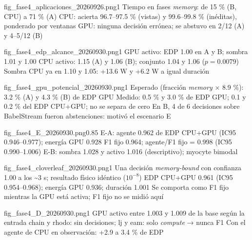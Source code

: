   {fig_fase4_aplicaciones_20260926.png}{1}
  {Tiempo en fases \textit{memory}: de 15 \% (B, CPU) a 71 \% (A)}
  {CPU: acierta 96.7--97.5 \% (vistas) y 99.6--99.8 \% (inéditas), ponderado por ventanas}
  {GPU: ninguna decisión errónea; se abstuvo en 2/12 (A) y 4--5/12 (B)}

  {fig_fase4_edp_alcance_20260930.png}{1}
  {GPU activo: EDP 1.00 en A y B; sombra 1.01 y 1.00}
  {CPU activo: 1.15 (A) y 1.06 (B); conjunto 1.04 y 1.06 ($p=0.0079$)}
  {Sombra CPU ya en 1.10 y 1.05: +13.6 W y +6.2 W a igual duración}

  {fig_fase4_gpu_potencial_20260930.png}{1}
  {Esperado (fracción \textit{memory} × 8.9 \%): 3.2 \% (A) y 4.3 \% (B) de EDP GPU}
  {Medido: 0.5 \% y 3.0 \% de EDP GPU; 0.1 y 0.2 \% del EDP CPU+GPU; no se separa de cero}
  {En B, 4 de 6 decisiones sobre BabelStream fueron abstenciones: motivó el escenario E}

  {fig_fase4_E_20260930.png}{0.85}
  {E-A: agente 0.962 de EDP CPU+GPU (IC95 0.946--0.977); energía GPU 0.928}
  {F1 fijo 0.964; agente/F1 fijo = 0.998 (IC95 0.990--1.006)}
  {E-B: sombra 1.028 y activo 1.016 (descriptivo); myocyte bimodal}

  {fig_fase4_cloverleaf_20260930.png}{1}
  {Una decisión \textit{memory-bound} con confianza 1.00 a los \textasciitilde 3 s; resultado físico idéntico ($10^{-8}$)}
  {EDP CPU+GPU 0.961 (IC95 0.954--0.968); energía GPU 0.936; duración 1.001}
  {Se comporta como F1 fijo mientras la GPU está activa; F1 fijo no se midió aquí}

  {fig_fase4_D_20260930.png}{1}
  {GPU activo entre 1.003 y 1.009 de la base según la entrada}
  {chain y rhodo: sin decisiones; lj y eam: solo \textit{compute} → nunca F1}
  {Con el agente de CPU en observación: +2.9 a 3.4 \% de EDP}

